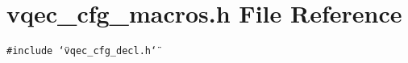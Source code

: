 \section{vqec\_\-cfg\_\-macros.h File Reference}
\label{vqec__cfg__macros_8h}
{\tt \#include \char`\"{}vqec\_\-cfg\_\-decl.h\char`\"{}}\par
